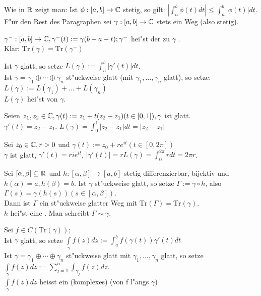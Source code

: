 \documentclass[a4paper,twoside,DIV15,BCOR12mm]{scrbook}
\def\Tr{\text{Tr}}
\def\abnC{\ensuremath{[a,b]\to\MdC}}
\def\wegint{\ensuremath{\int\limits_\gamma}}
\def\iint{\ensuremath{\int\limits}}
\begin{document}
Wie in $\mathbb{R}$ zeigt man: Ist $\phi:\abnC$ stetig, so gilt: $|\iint_a^b\phi(t)dt|\le\iint_a^b|\phi(t)|dt$.\\
F"ur den Rest des Paragraphen sei $\gamma:\abnC$ stets ein Weg (also stetig).

\begin{definition}
$\gamma^-:\abnC,\gamma^-(t):=\gamma(b+a-t);\gamma^-$ hei"st der zu $\gamma$ .\\
Klar: $\Tr(\gamma)=\Tr(\gamma^-)$
\end{definition}
\begin{definition}
  Ist $\gamma$ glatt, so setze $L(\gamma):=\iint_a^b|\gamma'(t)|dt$. \\
  Ist $\gamma = \gamma_1 \oplus \cdots \oplus \gamma_n$ st"uckweise glatt (mit $\gamma_1,\ldots,\gamma_n$ glatt), so setze:\\
  $L(\gamma):=L(\gamma_1)+\dots+L(\gamma_n)$\\
  $L(\gamma)$ hei"st  von $\gamma$.
\end{definition}

\begin{beispiele}
    \item Seien $z_1,z_2\in\mathbb{C},\gamma(t):=z_1+t(z_2-z_1)(t\in[0,1]),\gamma$ ist glatt.\\
      $\gamma'(t)=z_2-z_1$. 
      \folgt $L(\gamma)=\iint_0^1|z_2-z_1|dt=|z_2-z_1|$
    \item Sei $z_0\in\mathbb{C},r>0$ und $\gamma(t):=z_0+re^{it}(t\in[0,2\pi])$\\
     
      $\gamma$ ist glatt, $\gamma'(t)=rie^{it}$, $|\gamma'(t)|=r$\folgt $L(\gamma) = \iint_0^{2\pi}rdt=2\pi r$.
\end{beispiele}

\begin{definition}
Sei $[\alpha,\beta]\subseteq\mathbb{R}$ und $h:[\alpha,\beta]\to[a,b]$ stetig differenzierbar, bijektiv und $h(\alpha)=a,h(\beta)=b$. Ist $\gamma$ st"uckweise glatt, so setze $\Gamma:=\gamma \circ h$, also $\Gamma(s)=\gamma(h(s))(s\in[\alpha,\beta])$.\\
Dann ist $\Gamma$ ein st"uckweise glatter Weg mit $\Tr(\Gamma)=\Tr(\gamma)$.\\
$h$ hei"st eine . Man schreibt $\Gamma \sim \gamma$.
\end{definition}

\begin{definition}
Sei $f \in C(\Tr(\gamma));$\\
Ist $\gamma$ glatt, so setze $\wegint f(z)dz:=\iint_a^bf(\gamma(t))\gamma'(t)dt$\\
Ist $\gamma=\gamma_1 \oplus \cdots \oplus \gamma_n$ st"uckweise glatt mit $\gamma_1,\ldots,\gamma_n$ glatt, so setze $\wegint f(z)dz:=\sum\limits_{j=1}^n\iint_{\gamma_j} f(z)dz$.\\
$\wegint f(z)dz$ heisst ein (komplexes)  (von f l"angs $\gamma$)
\end{definition}
\end{document}
